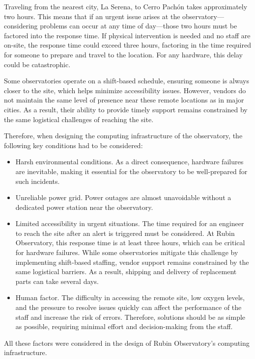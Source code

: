 Traveling from the nearest city, La Serena, to Cerro Pachón takes approximately two hours. This means that if an urgent issue arises at the observatory—considering problems can occur at any time of day—those two hours must be factored into the response time. If physical intervention is needed and no staff are on-site, the response time could exceed three hours, factoring in the time required for someone to prepare and travel to the location. For any hardware, this delay could be catastrophic. 

Some observatories operate on a shift-based schedule, ensuring someone is always closer to the site, which helps minimize accessibility issues. However, vendors do not maintain the same level of presence near these remote locations as in major cities. As a result, their ability to provide timely support remains constrained by the same logistical challenges of reaching the site.

Therefore, when designing the computing infrastructure of the observatory, the following key conditions had to be considered:

\begin {itemize}
\item Harsh environmental conditions. As a direct consequence, hardware failures are inevitable, making it essential for the observatory to be well-prepared for such incidents.
\item Unreliable power grid. Power outages are almost unavoidable without a dedicated power station near the observatory. 
\item Limited accessibility in urgent situations. The time required for an engineer to reach the site after an alert is triggered must be considered. At Rubin Observatory, this response time is at least three hours, which can be critical for hardware failures. While some observatories mitigate this challenge by implementing shift-based staffing, vendor support remains constrained by the same logistical barriers. As a result, shipping and delivery of replacement parts can take several days.
\item Human factor. The difficulty in accessing the remote site, low oxygen levels, and the pressure to resolve issues quickly can affect the performance of the staff and increase the risk of errors. Therefore, solutions should be as simple as possible, requiring minimal effort and decision-making from the staff.
\end {itemize}

All these factors were considered in the design of Rubin Observatory's computing infrastructure.

